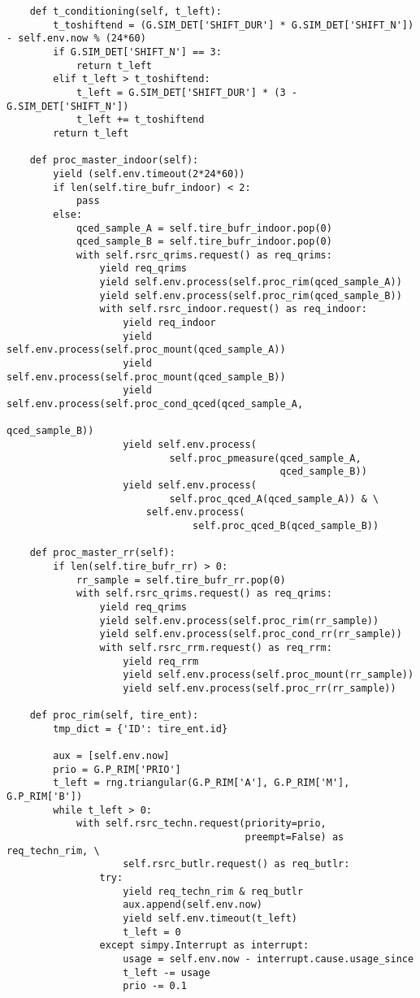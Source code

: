\begin{verbatim}
    def t_conditioning(self, t_left):
        t_toshiftend = (G.SIM_DET['SHIFT_DUR'] * G.SIM_DET['SHIFT_N']) - self.env.now % (24*60)
        if G.SIM_DET['SHIFT_N'] == 3:
            return t_left
        elif t_left > t_toshiftend:
            t_left = G.SIM_DET['SHIFT_DUR'] * (3 - G.SIM_DET['SHIFT_N'])
            t_left += t_toshiftend
        return t_left

    def proc_master_indoor(self):
        yield (self.env.timeout(2*24*60))
        if len(self.tire_bufr_indoor) < 2:
            pass
        else:
            qced_sample_A = self.tire_bufr_indoor.pop(0)
            qced_sample_B = self.tire_bufr_indoor.pop(0)
            with self.rsrc_qrims.request() as req_qrims:
                yield req_qrims
                yield self.env.process(self.proc_rim(qced_sample_A))
                yield self.env.process(self.proc_rim(qced_sample_B))
                with self.rsrc_indoor.request() as req_indoor:
                    yield req_indoor
                    yield self.env.process(self.proc_mount(qced_sample_A))
                    yield self.env.process(self.proc_mount(qced_sample_B))
                    yield self.env.process(self.proc_cond_qced(qced_sample_A,
                                                               qced_sample_B))
                    yield self.env.process(
                            self.proc_pmeasure(qced_sample_A,
                                               qced_sample_B))
                    yield self.env.process(
                            self.proc_qced_A(qced_sample_A)) & \
                        self.env.process(
                                self.proc_qced_B(qced_sample_B))

    def proc_master_rr(self):
        if len(self.tire_bufr_rr) > 0:
            rr_sample = self.tire_bufr_rr.pop(0)
            with self.rsrc_qrims.request() as req_qrims:
                yield req_qrims
                yield self.env.process(self.proc_rim(rr_sample))
                yield self.env.process(self.proc_cond_rr(rr_sample))
                with self.rsrc_rrm.request() as req_rrm:
                    yield req_rrm
                    yield self.env.process(self.proc_mount(rr_sample))
                    yield self.env.process(self.proc_rr(rr_sample))

    def proc_rim(self, tire_ent):
        tmp_dict = {'ID': tire_ent.id}

        aux = [self.env.now]
        prio = G.P_RIM['PRIO']
        t_left = rng.triangular(G.P_RIM['A'], G.P_RIM['M'], G.P_RIM['B'])
        while t_left > 0:
            with self.rsrc_techn.request(priority=prio,
                                         preempt=False) as req_techn_rim, \
                    self.rsrc_butlr.request() as req_butlr:
                try:
                    yield req_techn_rim & req_butlr
                    aux.append(self.env.now)
                    yield self.env.timeout(t_left)
                    t_left = 0
                except simpy.Interrupt as interrupt:
                    usage = self.env.now - interrupt.cause.usage_since
                    t_left -= usage
                    prio -= 0.1


\end{verbatim}
